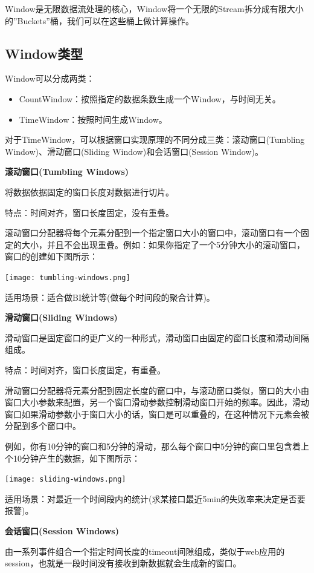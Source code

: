 \documentclass[oneside]{ctexbook}
\begin{document}
Window是无限数据流处理的核心，Window将一个无限的Stream拆分成有限大小的”Buckets”桶，我们可以在这些桶上做计算操作。

\subsection{Window类型}

Window可以分成两类：

\begin{itemize}
\item CountWindow：按照指定的数据条数生成一个Window，与时间无关。
\item TimeWindow：按照时间生成Window。
\end{itemize}

对于TimeWindow，可以根据窗口实现原理的不同分成三类：滚动窗口(Tumbling Window)、滑动窗口(Sliding Window)和会话窗口(Session Window)。

\textbf{滚动窗口(Tumbling Windows)}

将数据依据固定的窗口长度对数据进行切片。

特点：时间对齐，窗口长度固定，没有重叠。

滚动窗口分配器将每个元素分配到一个指定窗口大小的窗口中，滚动窗口有一个固定的大小，并且不会出现重叠。例如：如果你指定了一个5分钟大小的滚动窗口，窗口的创建如下图所示：

\noindent \texttt{[image: tumbling-windows.png]}

适用场景：适合做BI统计等(做每个时间段的聚合计算)。

\textbf{滑动窗口(Sliding Windows)}

滑动窗口是固定窗口的更广义的一种形式，滑动窗口由固定的窗口长度和滑动间隔组成。

特点：时间对齐，窗口长度固定，有重叠。

滑动窗口分配器将元素分配到固定长度的窗口中，与滚动窗口类似，窗口的大小由窗口大小参数来配置，另一个窗口滑动参数控制滑动窗口开始的频率。因此，滑动窗口如果滑动参数小于窗口大小的话，窗口是可以重叠的，在这种情况下元素会被分配到多个窗口中。

例如，你有10分钟的窗口和5分钟的滑动，那么每个窗口中5分钟的窗口里包含着上个10分钟产生的数据，如下图所示：

\noindent \texttt{[image: sliding-windows.png]}

适用场景：对最近一个时间段内的统计(求某接口最近5min的失败率来决定是否要报警)。

\textbf{会话窗口(Session Windows)}

由一系列事件组合一个指定时间长度的timeout间隙组成，类似于web应用的session，也就是一段时间没有接收到新数据就会生成新的窗口。
\end{document}
